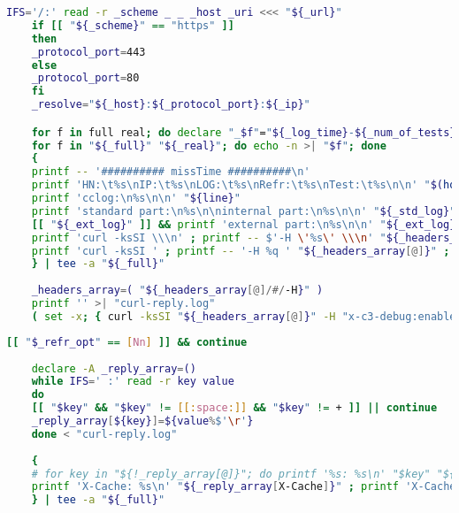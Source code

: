 \begin{appendices}
\begin{minipage}{0.8\linewidth}
\begin{lstlisting}[language=bash,caption={missTime Line by Line},label={py-misstime-line-by-line},basicstyle=\tiny\ttfamily,linewidth=\textwidth]
    IFS='/:' read -r _scheme _ _ _host _uri <<< "${_url}"
    if [[ "${_scheme}" == "https" ]]
    then
	_protocol_port=443
    else
	_protocol_port=80
    fi
    _resolve="${_host}:${_protocol_port}:${_ip}"

    for f in full real; do declare "_$f"="${_log_time}-${_num_of_tests}-$f.log"; done
    for f in "${_full}" "${_real}"; do echo -n >| "$f"; done  
    {
	printf -- '########## missTime ##########\n'
	printf 'HN:\t%s\nIP:\t%s\nLOG:\t%s\nRefr:\t%s\nTest:\t%s\n\n' "$(hostname)" "${_ip}" "${_log_time}" "${_refr_opt}" "${_num_of_tests}"
	printf 'cclog:\n%s\n\n' "${line}"
	printf 'standard part:\n%s\n\ninternal part:\n%s\n\n' "${_std_log}" "${_inr_log}"
	[[ "${_ext_log}" ]] && printf 'external part:\n%s\n\n' "${_ext_log}"
	printf 'curl -ksSI \\\n' ; printf -- $'-H \'%s\' \\\n' "${_headers_array[@]}" ; printf -- $'-H \'x-c3-debug:enabled\' \\\n--resolve \'%s\' \\\n\'%s\'\n\n' "${_resolve}" "${_url}" #'
	printf 'curl -ksSI ' ; printf -- '-H %q ' "${_headers_array[@]}" ; printf -- '-H %q --resolve %q %q\n\n' "x-c3-debug:enabled" "${_resolve}" "${_url}"
    } | tee -a "${_full}"
    
    _headers_array=( "${_headers_array[@]/#/-H}" )
    printf '' >| "curl-reply.log"
    ( set -x; { curl -ksSI "${_headers_array[@]}" -H "x-c3-debug:enabled" --resolve "${_resolve}" "${_url}" ; } 2>&1 ) | tee -a "${_full}" "curl-reply.log" 

\end{lstlisting}
\end{minipage}

\begin{minipage}{0.8\linewidth}
\begin{lstlisting}[language=bash,caption={missTime Line by Line},label={py-misstime-line-by-line},basicstyle=\tiny\ttfamily,linewidth=\textwidth]
    [[ "$_refr_opt" == [Nn] ]] && continue
    
    declare -A _reply_array=()
    while IFS=' :' read -r key value
    do
	[[ "$key" && "$key" != [[:space:]] && "$key" != + ]] || continue
	_reply_array[${key}]=${value%$'\r'}
    done < "curl-reply.log"
    
    {
	# for key in "${!_reply_array[@]}"; do printf '%s: %s\n' "$key" "${_reply_array[$key]}" ; done ; printf '\n'
	printf 'X-Cache: %s\n' "${_reply_array[X-Cache]}" ; printf 'X-Cache-Remote: %s\n' "${_reply_array[X-Cache-Remote]}" ; printf 'CC_CACHE: %s\n\n' "${_reply_array[CC_CACHE]}"
    } | tee -a "${_full}"


\end{lstlisting}
\end{minipage}
\end{appendices}
